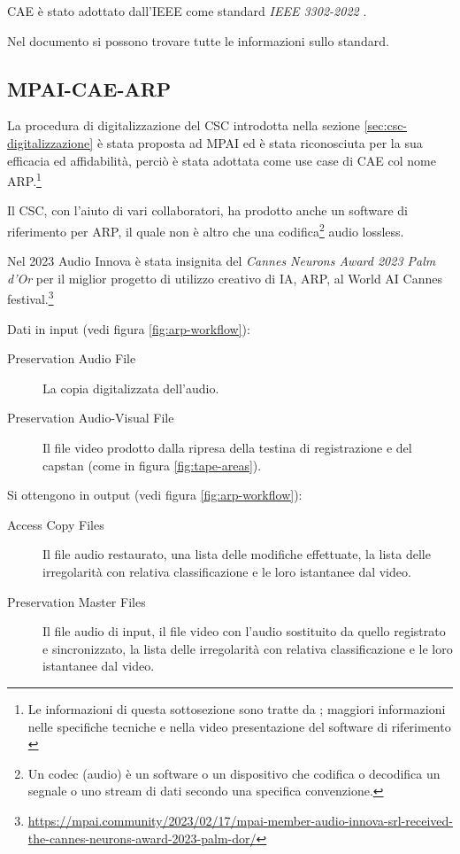 \ac{CAE} è stato adottato dall'\ac{IEEE} come standard \textit{IEEE 3302-2022} \cite{ieeeStandard3302-2022}.

Nel documento  si possono trovare tutte le informazioni sullo standard.


\subsection{MPAI-CAE-ARP} \label{ssec:mpai-cae-arp} %
La procedura di digitalizzazione del \ac{CSC} introdotta nella sezione \ref{sec:csc-digitalizzazione} è stata proposta ad \ac{MPAI} ed è stata riconosciuta per la sua efficacia ed affidabilità, perciò è stata adottata come use case di \ac{CAE} col nome \acf{ARP}.\footnote{Le informazioni di questa sottosezione sono tratte da \cite{mpaiMPAIDataCoding}; maggiori informazioni nelle specifiche tecniche \cite{ieeeStandard3302-2022} e nella video presentazione del software di riferimento \cite{mpaistandardsMPAIPresentsContextbased2023}}

Il \ac{CSC}, con l'aiuto di vari collaboratori, ha prodotto anche un software di riferimento per \ac{ARP}, il quale non è altro che una codifica\footnote{Un codec (audio) è un software o un dispositivo che codifica o decodifica un segnale o uno stream di dati secondo una specifica convenzione.} audio lossless.

Nel 2023 Audio Innova è stata insignita del \textit{Cannes Neurons Award 2023 Palm d'Or} per il miglior progetto di utilizzo creativo di IA, \ac{ARP}, al World AI Cannes festival.\footnote{\url{https://mpai.community/2023/02/17/mpai-member-audio-innova-srl-received-the-cannes-neurons-award-2023-palm-dor/}}

Dati in input (vedi figura \ref{fig:arp-workflow}):
\begin{description}
    \item[Preservation Audio File] La copia digitalizzata dell'audio.
    \item[Preservation Audio-Visual File] Il file video prodotto dalla ripresa della testina di registrazione e del capstan (come in figura \ref{fig:tape-areas}).
\end{description}

Si ottengono in output (vedi figura \ref{fig:arp-workflow}):
\begin{description}
    \item[Access Copy Files] Il file audio restaurato, una lista delle modifiche effettuate, la lista delle irregolarità con relativa classificazione e le loro istantanee dal video.
    \item[Preservation Master Files] Il file audio di input, il file video con l'audio sostituito da quello registrato e sincronizzato, la lista delle irregolarità con relativa classificazione e le loro istantanee dal video.
\end{description}

